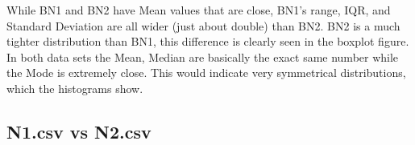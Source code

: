 \documentclass[10pt]{article}
\begin{document}
\par
{}%
\hfill
{}%
\par
While BN1 and BN2 have Mean values that are close, BN1's range, IQR, and Standard Deviation are all wider (just about double) than BN2. BN2 is a much tighter distribution than BN1, this difference is clearly seen in the boxplot figure. In both data sets the Mean, Median are basically the exact same number while the Mode is extremely close. This would indicate very symmetrical distributions, which the histograms show.\\
\newline
\newline 
\newline
\newline 
\newline
\newline  
\subsection*{N1.csv vs N2.csv}
\end{document}

